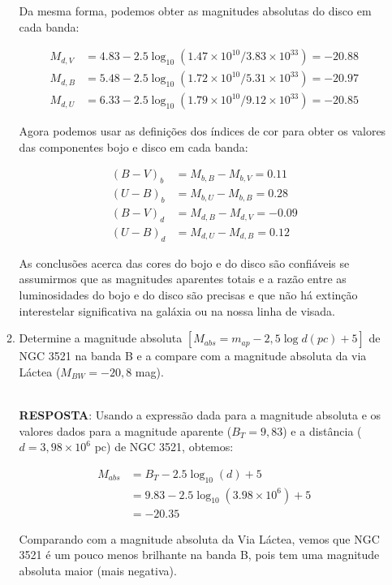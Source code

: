 \documentclass[a4paper,12pt]{article}
\begin{document}
\begin{enumerate}
\begin{enumerate}
Da mesma forma, podemos obter as magnitudes absolutas do disco em cada banda:

\begin{align*}
M_{d,V} &= 4.83 - 2.5\log_{10}(1.47\times 10^{10}/3.83\times 10^{33}) = -20.88 \\
M_{d,B} &= 5.48 - 2.5\log_{10}(1.72\times 10^{10}/5.31\times 10^{33}) = -20.97 \\
M_{d,U} &= 6.33 - 2.5\log_{10}(1.79\times 10^{10}/9.12\times 10^{33}) = -20.85
\end{align*}

Agora podemos usar as definições dos índices de cor para obter os valores das componentes bojo e disco em cada banda:

\begin{align*}
(B-V)_b &= M_{b,B} - M_{b,V} = 0.11 \\
(U-B)_b &= M_{b,U} - M_{b,B} = 0.28 \\
(B-V)_d &= M_{d,B} - M_{d,V} = -0.09 \\
(U-B)_d &= M_{d,U} - M_{d,B} = 0.12
\end{align*}

As conclusões acerca das cores do bojo e do disco são confiáveis se assumirmos que as magnitudes aparentes totais e a razão entre as luminosidades do bojo e do disco são precisas e que não há extinção interestelar significativa na galáxia ou na nossa linha de visada.

\noindent\hrulefill

\item Determine a magnitude absoluta $[M_{abs} = m_{ap} - 2,5 \log d(pc) +5]$ de NGC 3521 na banda B e a compare com a magnitude absoluta da via Láctea ($M_{BW}=-20,8$ mag).
    
\noindent\hrulefill\\\textbf{RESPOSTA}: Usando a expressão dada para a magnitude absoluta e os valores dados para a magnitude aparente ($B_T=9,83$) e a distância ($d=3,98\times 10^6$ pc) de NGC 3521, obtemos:

\begin{align*}
M_{abs} &= B_T - 2.5\log_{10}(d) + 5 \\
&= 9.83 - 2.5\log_{10}(3.98\times 10^6) + 5 \\
&= -20.35
\end{align*}

Comparando com a magnitude absoluta da Via Láctea, vemos que NGC 3521 é um pouco menos brilhante na banda B, pois tem uma magnitude absoluta maior (mais negativa).


\end{enumerate}
\end{enumerate}
\end{document}
